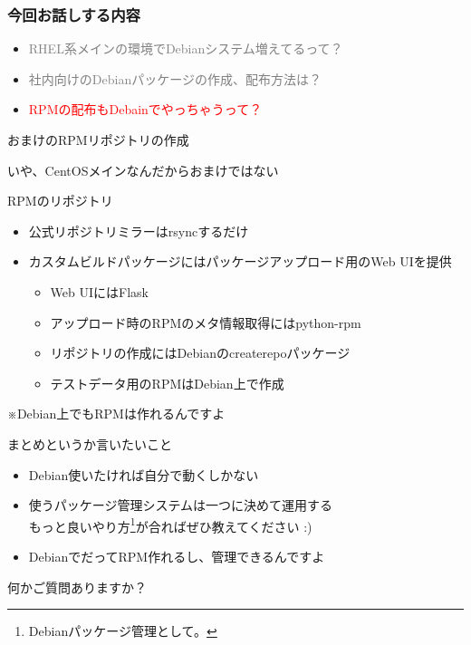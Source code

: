 \begin{frame}
  \frametitle{今回お話しする内容}
  \begin{itemize}
  \item \textcolor{gray}{RHEL系メインの環境でDebianシステム増えてるって？}
  \item \textcolor{gray}{社内向けのDebianパッケージの作成、配布方法は？}
  \item \textcolor{red}{RPMの配布もDebainでやっちゃうって？}
  \end{itemize}
\end{frame}

\begin{frame}
{\Huge おまけのRPMリポジトリの作成}
\end{frame}


\begin{frame}
{\Huge いや、CentOSメインなんだからおまけではない}
\end{frame}

\begin{frame}{RPMのリポジトリ}
\begin{itemize}
\item 公式リポジトリミラーはrsyncするだけ
\item カスタムビルドパッケージにはパッケージアップロード用のWeb UIを提供
  \begin{itemize}
    \item Web UIにはFlask
    \item アップロード時のRPMのメタ情報取得にはpython-rpm
    \item リポジトリの作成にはDebianのcreaterepoパッケージ
    \item テストデータ用のRPMはDebian上で作成
  \end{itemize}
\end{itemize}
※Debian上でもRPMは作れるんですよ
\end{frame}

\begin{frame}{まとめというか言いたいこと}
  \begin{itemize}
    \item Debian使いたければ自分で動くしかない
    \item 使うパッケージ管理システムは一つに決めて運用する
      \\もっと良いやり方\footnote{Debianパッケージ管理として。}が合ればぜひ教えてください :)
    \item DebianでだってRPM作れるし、管理できるんですよ
  \end{itemize}
\end{frame}

\begin{frame}
\begin{center}
{\Huge 何かご質問ありますか？}
\end{center}
\end{frame}


